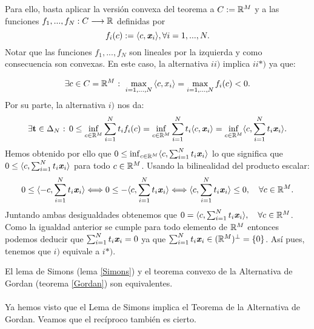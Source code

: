 Para ello, basta aplicar la versión convexa del teorema a $ C := \mathbb{R}^M $ y a las funciones $ f_1,...,f_N : C \longrightarrow \mathbb{R} $ definidas por \[ f_i(c):=\langle c, \textbf{\emph{x}}_i \rangle , \forall i=1,...,N.\] Notar que las funciones $ f_1,...,f_N $ son lineales por la izquierda y como consecuencia son convexas. En este caso, la alternativa $ ii) $ implica $ ii*) $ ya que:

\begin{equation*}
\exists c \in C = \mathbb{R}^M \text{ : } \max_{i=1,...,N} {\langle c,x_i \rangle}  =  \max_{i=1,...,N}f_i (c) < 0 .
\end{equation*}
Por su parte, la alternativa $ i) $ nos da:
\begin{equation*}
\exists \mathbf{t} \in \Delta_N \text{ : } 0 \leq \inf_{c \in \mathbb{R}^M}  \sum_{i=1}^{N}{t_i f_i(c) } = \inf_{c \in \mathbb{R}^M} \sum_{i=1}^{N}{t_i\langle c, \textbf{\emph{x}}_i \rangle} = \inf_{c \in \mathbb{R}^M} \langle c, \sum_{i=1}^{N}{t_i 	\textbf{\emph{x}}_i} \rangle. 
\end{equation*}
Hemos obtenido por ello que  $0  \leq \inf_{c \in \mathbb{R}^M} \langle c, \sum_{i=1}^{N}{t_i \textbf{\emph{x}}_i} \rangle  $ lo que significa que $ 0 \leq \langle c, \sum_{i=1}^{N}{t_i \textbf{\emph{x}}_i} \rangle  $ para todo $ c \in \mathbb{R}^M $. Usando la bilinealidad del producto escalar:
\[
0 \leq \langle -c, \sum_{i=1}^{N}{t_i \textbf{\emph{x}}_i} \rangle \Longleftrightarrow 	0 \leq -\langle c, \sum_{i=1}^{N}{t_i \textbf{\emph{x}}_i} \rangle 
\Longleftrightarrow  \langle c, \sum_{i=1}^{N}{t_i \textbf{\emph{x}}_i}\rangle \leq 0, \quad \forall c \in \mathbb{R}^M.
\]
Juntando ambas desigualdades obtenemos que $ 0 =  \langle c, \sum_{i=1}^{N}{t_i \textbf{\emph{x}}_i}\rangle, \quad \forall c \in \mathbb{R}^M $. Como la igualdad anterior se cumple para todo elemento de $ \mathbb{R}^M $ entonces podemos deducir que $ \sum_{i=1}^{N}{t_i \textbf{\emph{x}}_i} = 0 $	ya que $ \sum_{i=1}^{N}{t_i \textbf{\emph{x}}_i} \in (\mathbb{R}^M)^{\perp} = \{0\} $. Así pues, tenemos que $ i) $ equivale a $ i*) $. \hspace{5.7cm}\qedsymbol 

\bigskip
\begin{observacion}
	El lema de Simons (lema \ref{Simons}) y el teorema convexo de la Alternativa de Gordan (teorema \ref{Gordan}) son equivalentes.
\end{observacion}

\paragraph{} Ya hemos visto que el Lema de Simons implica el Teorema de la Alternativa de Gordan. Veamos que el recíproco también es cierto.  \\


